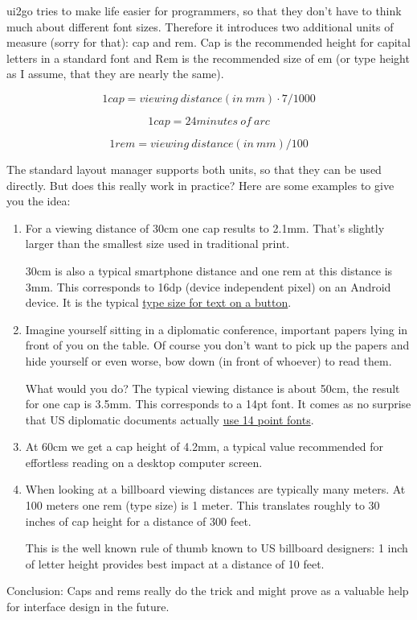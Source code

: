 ui2go tries to make life easier for programmers, so that they don't have
to think much about different font sizes. Therefore it introduces two
additional units of measure (sorry for that): cap and rem. Cap is the
recommended height for capital letters in a standard font and Rem is the
recommended size of em (or type height as I assume, that they are nearly
the same).

$$ 1 cap = viewing\ distance(in\ mm) \cdot 7 / 1000 $$

$$ 1 cap = 24 minutes\ of\ arc $$

$$ 1 rem = viewing\ distance(in\ mm) / 100 $$

The standard layout manager supports both units, so that they can be
used directly. But does this really work in practice? Here are some
examples to give you the idea:

\begin{enumerate}
\item
  For a viewing distance of 30cm one cap results to 2.1mm. That's
  slightly larger than the smallest size used in traditional print.

  30cm is also a typical smartphone distance and one rem at this
  distance is 3mm. This corresponds to 16dp (device independent pixel)
  on an Android device. It is the typical
  \href{http://developer.android.com/design/style/metrics-grids.html}{type
  size for text on a button}.
\item
  Imagine yourself sitting in a diplomatic conference, important papers
  lying in front of you on the table. Of course you don't want to pick
  up the papers and hide yourself or even worse, bow down (in front of
  whoever) to read them.

  What would you do? The typical viewing distance is about 50cm, the
  result for one cap is 3.5mm. This corresponds to a 14pt font. It comes
  as no surprise that US diplomatic documents actually
  \href{http://en.wikipedia.org/wiki/Times_New_Roman}{use 14 point
  fonts}.
\item
  At 60cm we get a cap height of 4.2mm, a typical value recommended for
  effortless reading on a desktop computer screen.
\item
  When looking at a billboard viewing distances are typically many
  meters. At 100 meters one rem (type size) is 1 meter. This translates
  roughly to 30 inches of cap height for a distance of 300 feet.

  This is the well known rule of thumb known to US billboard designers:
  1 inch of letter height provides best impact at a distance of 10 feet.
\end{enumerate}

Conclusion: Caps and rems really do the trick and might prove as a
valuable help for interface design in the future.

